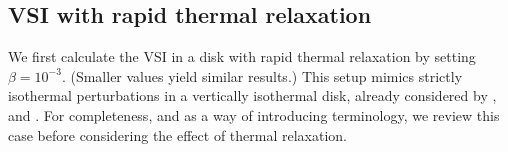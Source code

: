 \subsection{VSI with rapid thermal relaxation}\label{vertiso_pertiso} 
We first calculate the VSI in a disk with rapid thermal relaxation by
setting $\beta=10^{-3}$. (Smaller values yield similar results.) 
This setup mimics strictly isothermal perturbations in a vertically
isothermal disk, already considered by \cite{nelson13}, \cite{mcnally14} and
\cite{barker15}. 
For completeness, and as a way of introducing terminology, 
we review this case before considering the effect of 
thermal relaxation. %




